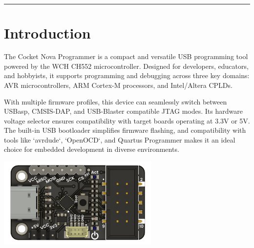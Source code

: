\documentclass[10pt]{article}
\title{}
\author{}
\date{}
\begin{document}
\noindent
{}
\vspace{1em}
\hrule
\vspace{1.5em}

\section*{Introduction}
\vspace{0.5em}
\noindent
\begin{minipage}[t]{0.62\textwidth}
\setlength{\parskip}{0.75em}
\justifying
The Cocket Nova Programmer is a compact and versatile USB programming tool powered by the WCH CH552 microcontroller. Designed for developers, educators, and hobbyists, it supports programming and debugging across three key domains: AVR microcontrollers, ARM Cortex-M processors, and Intel/Altera CPLDs.

\par

With multiple firmware profiles, this device can seamlessly switch between USBasp, CMSIS-DAP, and USB-Blaster compatible JTAG modes. Its hardware voltage selector ensures compatibility with target boards operating at 3.3V or 5V. The built-in USB bootloader simplifies firmware flashing, and compatibility with tools like `avrdude`, `OpenOCD`, and Quartus Programmer makes it an ideal choice for embedded development in diverse environments.
\end{minipage}
\hfill
\begin{minipage}[t]{0.35\textwidth}
\centering
\vspace{-0.5em}
\includegraphics[height=4.5cm,keepaspectratio]{./images/product.png}
\end{minipage}
\end{document}
